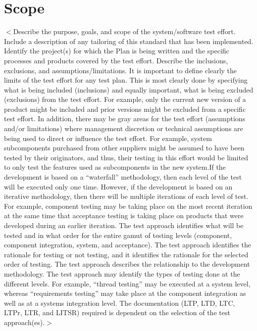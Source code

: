 \documentclass{scrreprt}
\begin{document}
\section{Scope}
$<$Describe the purpose, goals, and scope of the system/software test effort. Include a description of any
tailoring of this standard that has been implemented. Identify the project(s) for which the Plan is being
written and the specific processes and products covered by the test effort. Describe the inclusions,
exclusions, and assumptions/limitations. It is important to define clearly the limits of the test effort for
any test plan. This is most clearly done by specifying what is being included (inclusions) and equally
important, what is being excluded (exclusions) from the test effort. For example, only the current new
version of a product might be included and prior versions might be excluded from a specific test effort.
In addition, there may be gray areas for the test effort (assumptions and/or limitations) where
management discretion or technical assumptions are being used to direct or influence the test effort.
For example, system subcomponents purchased from other suppliers might be assumed to have been
tested by their originators, and thus, their testing in this effort would be limited to only test the features
used as subcomponents in the new system.If the development is based on a “waterfall” methodology, then each level of the test will be executed
only one time. However, if the development is based on an iterative methodology, then there will be
multiple iterations of each level of test. For example, component testing may be taking place on the
most recent iteration at the same time that acceptance testing is taking place on products that were
developed during an earlier iteration.
The test approach identifies what will be tested and in what order for the entire gamut of testing levels
(component, component integration, system, and acceptance). The test approach identifies the rationale
for testing or not testing, and it identifies the rationale for the selected order of testing. The test
approach describes the relationship to the development methodology. The test approach may identify
the types of testing done at the different levels. For example, “thread testing” may be executed at a
system level, whereas “requirements testing” may take place at the component integration as well as at
a systems integration level.
The documentation (LTP, LTD, LTC, LTPr, LTR, and LITSR) required is dependent on the selection
of the test approach(es).$>$
\end{document}
